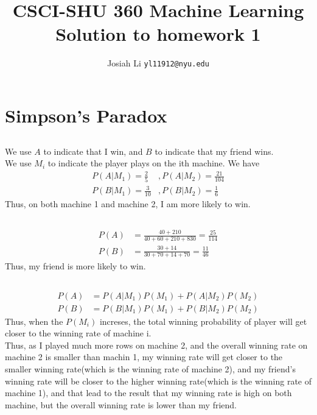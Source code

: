 \documentclass{article}
\title{CSCI-SHU 360 Machine Learning\\
    Solution to homework 1}
\author{Josiah Li \texttt{yl11912@nyu.edu}}
\begin{document}
    \maketitle
\section{Simpson's Paradox}\label{sec:Simpson's Paradox} %

\subsection{} %
We use $ A $ to indicate that I win, and $ B $ to indicate that my friend wins.\\
We use $ M_i $ to indicate the player plays on the ith machine.
We have 
\begin{align*}
    P(A|M_1) = \frac{2}{5}&, P(A|M_2) = \frac{21}{104}\\
    P(B|M_1) = \frac{3}{10 }&, P(B|M_2) = \frac{1}{6}
\end{align*}
Thus, on both machine 1 and machine 2, I am more likely to win.

\subsection{}
\begin{align*}
    P(A) &= \frac{40 + 210}{40 + 60 + 210 + 830} = \frac{25}{114} \\
    P(B) &= \frac{30 + 14}{30 + 70 + 14 + 70} = \frac{11 }{46}
\end{align*}
Thus, my friend is more likely to win.

\subsection{} %
\begin{align*}
    P(A) &= P(A|M_1)P(M_1) + P(A|M_2)P(M_2) \\ 
    P(B) &= P(B|M_1)P(M_1) + P(B|M_2)P(M_2)
\end{align*}
Thus, when the $ P(M_i) $ increses, the total winning probability of player will get closer to the winning rate of machine i. \\ 
Thus, as I played much more rows on machine 2, and the overall winning rate on machine 2 is smaller than machin 1, my winning rate will get closer to the smaller winning rate(which is the winning rate of machine 2), and my friend's winning rate will be closer to the higher winning rate(which is the winning rate of machine 1), and that lead to the result that my winning rate is high on both machine, but the overall winning rate is lower than my friend.
\end{document}
